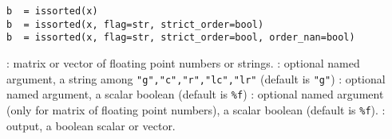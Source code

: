 
\begin{mandesc}
\end{mandesc}

\begin{calling_sequence}
\begin{verbatim}
b  = issorted(x)
b  = issorted(x, flag=str, strict_order=bool)
b  = issorted(x, flag=str, strict_order=bool, order_nan=bool)
\end{verbatim}
\end{calling_sequence}
\begin{parameters}
  \begin{varlist}
    :  matrix or vector of floating point numbers or strings.
    : optional named argument, a string among
    \verb+"g","c","r","lc","lr"+ (default is \verb+"g"+)
    : optional named argument, a scalar boolean (default is \verb+%f+)
    : optional named argument (only for matrix of floating point numbers), a scalar boolean (default is \verb+%f+).
    : output, a boolean scalar or vector.
  \end{varlist}
\end{parameters}

